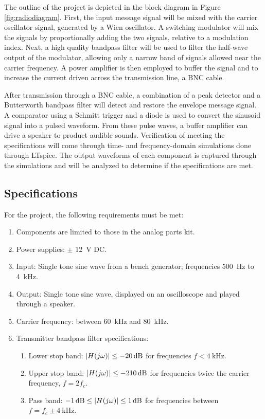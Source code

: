 \documentclass[11pt,letter,notitlepage]{article}
\begin{document}
	The outline of the project is depicted in the block diagram in Figure \ref{fig:radiodiagram}. First, the input message signal will be mixed with the carrier oscillator signal, generated by a Wien oscillator. A switching modulator will mix the signals by proportionally adding the two signals, relative to a modulation index. Next, a high quality bandpass filter will be used to filter the half-wave output of the modulator, allowing only a narrow band of signals allowed near the carrier frequency. A power amplifier is then employed to buffer the signal and to increase the current driven across the transmission line, a BNC cable.
	
	After transmission through a BNC cable, a combination of a peak detector and a Butterworth bandpass filter will detect and restore the envelope message signal. A comparator using a Schmitt trigger and a diode is used to convert the sinusoid signal into a pulsed waveform. From these pulse waves, a buffer amplifier can drive a speaker to product audible sounds. Verification of meeting the specifications will come through time- and frequency-domain simulations done through LTspice. The output waveforms of each component is captured through the simulations and will be analyzed to determine if the specifications are met.
	\clearpage
	
	\subsection{Specifications}
	For the project, the following requirements must be met:
	\begin{enumerate}
		\item Components are limited to those in the analog parts kit.
		\item Power supplies: $\pm$ \SI{12}{\V} DC.
		\item Input: Single tone sine wave from a bench generator; frequencies \SI{500}{\Hz} to \SI{4}{\kHz}.
		\item Output: Single tone sine wave, displayed on an oscilloscope and played through a speaker.
		\item Carrier frequency: between \SI{60}{\kHz} and \SI{80}{\kHz}.
		\item Transmitter bandpass filter specifications: \begin{enumerate}
			\item Lower stop band: $\abs{H(j \omega)} \le \SI{-20}{\dB}$ for frequencies $f < \SI{4}{\kHz}$.
			\item Upper stop band: $\abs{H(j \omega)} \le \SI{-210}{\dB}$ for frequencies twice the carrier frequency, $f = 2 f_c$.
			\item Pass band: $\SI{-1}{\dB} \le \abs{H(j \omega)} \le \SI{1}{\dB}$ for frequencies between $f = f_c \pm \SI{4}{\kHz}$.
		\end{enumerate}
	\end{enumerate}
	\clearpage
	
\end{document}
